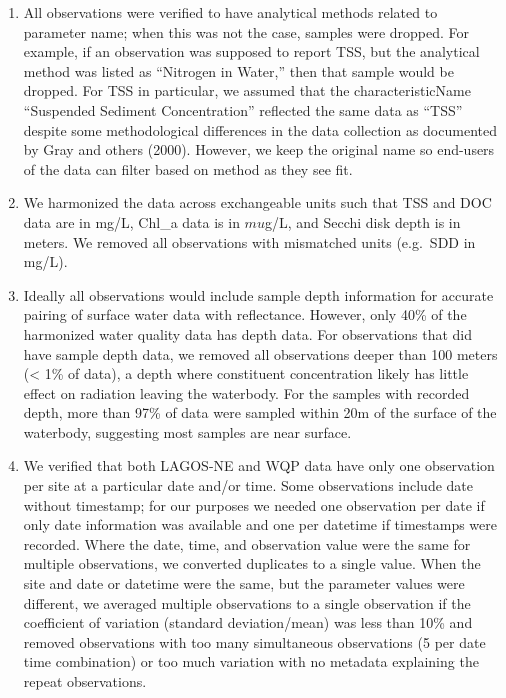 \documentclass[draft,linenumbers]{agujournal2018}
\begin{document}
\begin{enumerate}
\def\labelenumi{\arabic{enumi}.}
\item
  All observations were verified to have analytical methods related to
  parameter name; when this was not the case, samples were dropped. For
  example, if an observation was supposed to report TSS, but the
  analytical method was listed as ``Nitrogen in Water,'' then that
  sample would be dropped. For TSS in particular, we assumed that the
  characteristicName ``Suspended Sediment Concentration'' reflected the
  same data as ``TSS'' despite some methodological differences in the
  data collection as documented by Gray and others (2000). However, we
  keep the original name so end-users of the data can filter based on
  method as they see fit.
\item
  We harmonized the data across exchangeable units such that TSS and DOC
  data are in mg/L, Chl\_a data is in \(mu\)g/L, and Secchi disk depth
  is in meters. We removed all observations with mismatched units
  (e.g.~SDD in mg/L).
\item
  Ideally all observations would include sample depth information for
  accurate pairing of surface water data with reflectance. However, only
  40\% of the harmonized water quality data has depth data. For
  observations that did have sample depth data, we removed all
  observations deeper than 100 meters (\textless{} 1\% of data), a depth
  where constituent concentration likely has little effect on radiation
  leaving the waterbody. For the samples with recorded depth, more than
  97\% of data were sampled within 20m of the surface of the waterbody,
  suggesting most samples are near surface.
\item
  We verified that both LAGOS-NE and WQP data have only one observation
  per site at a particular date and/or time. Some observations include
  date without timestamp; for our purposes we needed one observation per
  date if only date information was available and one per datetime if
  timestamps were recorded. Where the date, time, and observation value
  were the same for multiple observations, we converted duplicates to a
  single value. When the site and date or datetime were the same, but
  the parameter values were different, we averaged multiple observations
  to a single observation if the coefficient of variation (standard
  deviation/mean) was less than 10\% and removed observations with too
  many simultaneous observations (5 per date time combination) or too
  much variation with no metadata explaining the repeat observations.

\end{enumerate}
\end{document}
